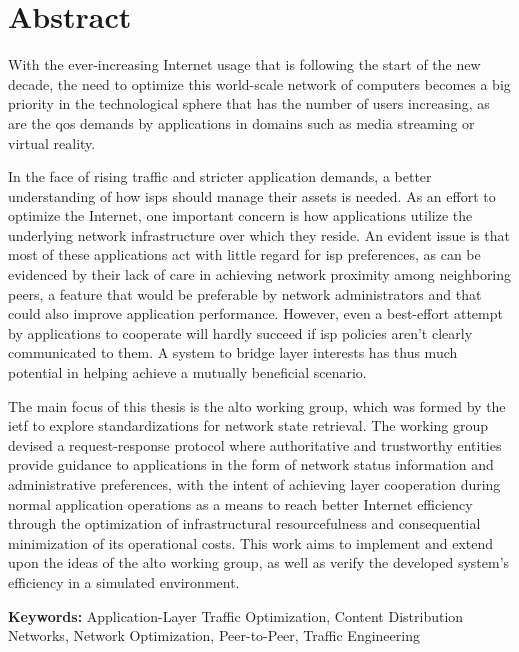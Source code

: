 \chapter{Abstract}

    With the ever-increasing Internet usage that is following the start of the new decade, the need to optimize this world-scale network of computers becomes a big priority in the technological sphere that has the number of users increasing, as are the \gls{qos} demands by applications in domains such as media streaming or virtual reality.

    In the face of rising traffic and stricter application demands, a better understanding of how \glspl{isp} should manage their assets is needed.
    As an effort to optimize the Internet, one important concern is how applications utilize the underlying network infrastructure over which they reside.
    An evident issue is that most of these applications act with little regard for \gls{isp} preferences, as can be evidenced by their lack of care in achieving network proximity among neighboring peers, a feature that would be preferable by network administrators and that could also improve application performance.
    However, even a best-effort attempt by applications to cooperate will hardly succeed if \gls{isp} policies aren't clearly communicated to them.
    A system to bridge layer interests has thus much potential in helping achieve a mutually beneficial scenario.

    The main focus of this thesis is the \gls{alto} working group, which was formed by the \gls{ietf} to explore standardizations for network state retrieval. 
    The working group devised a request-response protocol where authoritative and trustworthy entities provide guidance to applications in the form of network status information and administrative preferences, with the intent of achieving layer cooperation during normal application operations as a means to reach better Internet efficiency through the optimization of infrastructural resourcefulness and consequential minimization of its operational costs.
    This work aims to implement and extend upon the ideas of the \gls{alto} working group, as well as verify the developed system's efficiency in a simulated environment.

    \bigskip

    \textbf{Keywords:} Application-Layer Traffic Optimization, Content Distribution Networks, Network Optimization, Peer-to-Peer, Traffic Engineering


